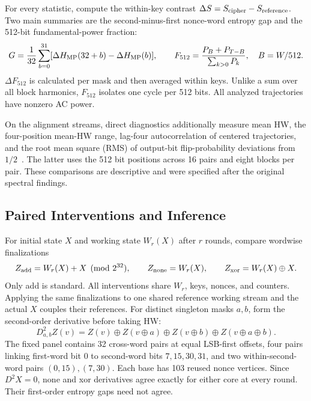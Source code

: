 \documentclass[electronics,article,submit,pdftex,oneauthor]{Definitions/mdpi}
\begin{document}
For every statistic, compute the within-key contrast $\Delta S=S_{\rm cipher}-S_{\rm reference}$. Two main summaries are the second-minus-first nonce-word entropy gap and the 512-bit fundamental-power fraction:
\begin{equation}
 G=\frac1{32}\sum_{b=0}^{31}[\Delta H_{\rm MP}(32+b)-\Delta H_{\rm MP}(b)],
 \qquad F_{512}=\frac{P_B+P_{T-B}}{\sum_{k>0}P_k},\quad B=W/512.
 \label{eq:gapfundamental}
\end{equation}
$\Delta F_{512}$ is calculated per mask and then averaged within keys. Unlike a sum over all block harmonics, $F_{512}$ isolates one cycle per 512 bits. All analyzed trajectories have nonzero AC power.

On the alignment streams, direct diagnostics additionally measure mean HW, the four-position mean-HW range, lag-four autocorrelation of centered trajectories, and the root mean square (RMS) of output-bit flip-probability deviations from $1/2$~\citep{webster1986}. The latter uses the 512 bit positions across 16 pairs and eight blocks per pair. These comparisons are descriptive and were specified after the original spectral findings.

\subsection{Paired Interventions and Inference}\label{sec:interventions}

For initial state $X$ and working state $W_r(X)$ after $r$ rounds, compare wordwise finalizations
\begin{equation}
 Z_{\rm add}=W_r(X)+X\pmod{2^{32}},\qquad
 Z_{\rm none}=W_r(X),\qquad Z_{\rm xor}=W_r(X)\oplus X.
 \label{eq:ffvariants}
\end{equation}
Only add is standard. All interventions share $W_r$, keys, nonces, and counters. Applying the same finalizations to one shared reference working stream and the actual $X$ couples their references. For distinct singleton masks $a,b$, form the second-order derivative before taking HW:
\begin{equation}
 D^2_{a,b}Z(v)=Z(v)\oplus Z(v\oplus a)\oplus Z(v\oplus b)\oplus Z(v\oplus a\oplus b).
 \label{eq:derivative}
\end{equation}
The fixed panel contains 32 cross-word pairs at equal LSB-first offsets, four pairs linking first-word bit 0 to second-word bits $7,15,30,31$, and two within-second-word pairs $(0,15),(7,30)$. Each base has 103 reused nonce vertices. Since $D^2X=0$, none and xor derivatives agree exactly for either core at every round. Their first-order entropy gaps need not agree.
\end{document}
